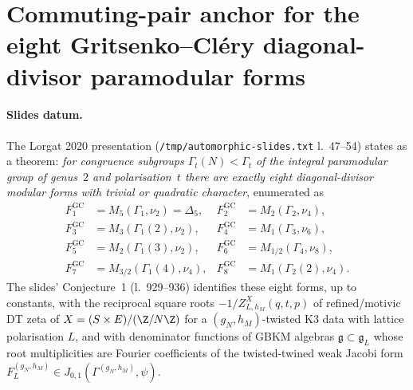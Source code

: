 
\providecommand{\ClaimStatusTheorem}{\textbf{[Theorem]}}
\providecommand{\ClaimStatusConjectured}{\textbf{[Conjecture]}}
\providecommand{\ClaimStatusAxiomatic}{\textbf{[Axiom]}}
\providecommand{\ZellK}[2]{Z^{(#1,#2)}_{\mathrm{ell}}(K3)}
\providecommand{\GCform}[1]{F^{\mathrm{GC}}_{#1}}
\providecommand{\Paramod}[1]{\Gamma_{#1}}
\providecommand{\Heckecong}[2]{\Gamma_{#1}(#2)}
\providecommand{\kBKM}{\kappa_{\mathrm{BKM}}}
\providecommand{\kch}{\kappa_{\mathrm{ch}}}
\providecommand{\CM}{C_{M_{24}}}

\section*{Commuting-pair anchor for the eight Gritsenko--Cl\'ery
diagonal-divisor paramodular forms}

\paragraph{Slides datum.}
The Lorgat 2020 presentation (\texttt{/tmp/automorphic-slides.txt}
l.~47--54) states as a theorem: \emph{for congruence subgroups
$\Paramod{t}(N)<\Paramod{t}$ of the integral paramodular group of
genus~$2$ and polarisation~$t$ there are exactly eight
diagonal-divisor modular forms with trivial or quadratic character},
enumerated as
\begin{align*}
\GCform{1}&=M_5(\Paramod{1},\nu_2)=\Delta_5, &
\GCform{2}&=M_2(\Paramod{2},\nu_4),\\
\GCform{3}&=M_3(\Heckecong{1}{2},\nu_2), &
\GCform{4}&=M_1(\Paramod{3},\nu_6),\\
\GCform{5}&=M_2(\Heckecong{1}{3},\nu_2), &
\GCform{6}&=M_{1/2}(\Paramod{4},\nu_8),\\
\GCform{7}&=M_{3/2}(\Heckecong{1}{4},\nu_4), &
\GCform{8}&=M_1(\Heckecong{2}{2},\nu_4).
\end{align*}
The slides' Conjecture~1 (l.~929--936) identifies these eight forms,
up to constants, with the reciprocal square roots
$-1/Z^{X}_{L,h_M}(q,t,p)$ of refined/motivic DT zeta of
$X=(S\times E)/(\Z/N\Z)$ for a $(g_N,h_M)$-twisted K3 data with
lattice polarisation $L$, and with denominator functions of GBKM
algebras $\mathfrak{g}\subset\mathfrak{g}_L$ whose root multiplicities
are Fourier coefficients of the twisted-twined weak Jacobi form
$F^{(g_N,h_M)}_L\in J_{0,1}(\Gamma^{(g_N,h_M)},\psi)$.

